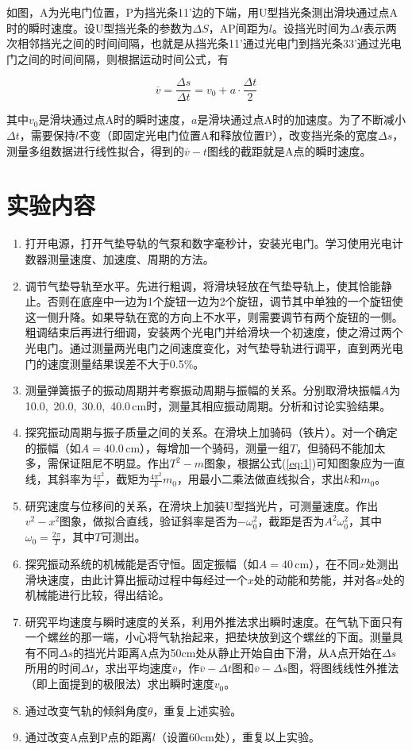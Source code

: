 \documentclass[12pt]{article}
\begin{document}
如图，A为光电门位置，P为挡光条11'边的下端，用U型挡光条测出滑块通过点A时的瞬时速度。设U型挡光条的参数为$\Delta S$，AP间距为$l$。设挡光时间为$\Delta t$表示两次相邻挡光之间的时间间隔，也就是从挡光条11'通过光电门到挡光条33'通过光电门之间的时间间隔，则根据运动时间公式，有

\[
    \overline{v}=\frac{\Delta s}{\Delta t}=v_0+a\cdot\frac{\Delta t}{2}
\]

其中$v_0$是滑块通过点A时的瞬时速度，$a$是滑块通过点A时的加速度。为了不断减小$\Delta t$，需要保持$l$不变（即固定光电门位置A和释放位置P），改变挡光条的宽度$\Delta s$，测量多组数据进行线性拟合，得到的$\overline{v}-t$图线的截距就是A点的瞬时速度。

\section{实验内容}
\begin{enumerate}
    \item 打开电源，打开气垫导轨的气泵和数字毫秒计，安装光电门。学习使用光电计数器测量速度、加速度、周期的方法。
    \item 调节气垫导轨至水平。先进行粗调，将滑块轻放在气垫导轨上，使其恰能静止。否则在底座中一边为1个旋钮一边为2个旋钮，调节其中单独的一个旋钮使这一侧升降。如果导轨在宽的方向上不水平，则需要调节有两个旋钮的一侧。粗调结束后再进行细调，安装两个光电门并给滑块一个初速度，使之滑过两个光电门。通过测量两光电门之间速度变化，对气垫导轨进行调平，直到两光电门的速度测量结果误差不大于0.5\%。
    \item 测量弹簧振子的振动周期并考察振动周期与振幅的关系。分别取滑块振幅$ A $为10.0,\ 20.0,\ 30.0,\ 40.0\,cm时，测量其相应振动周期。分析和讨论实验结果。
    \item 探究振动周期与振子质量之间的关系。在滑块上加骑码（铁片）。对一个确定的振幅（如$A=40.0\,\mathrm{cm}$），每增加一个骑码，测量一组$ T $，但骑码不能加太多，需保证阻尼不明显。作出$ T^2-m $图象，根据公式(\ref{eq:1})可知图象应为一直线，其斜率为$ \frac{4\pi^2}{k} $，截矩为$ \frac{4\pi^2}{k}m_0 $，用最小二乘法做直线拟合，求出$k$和$m_0$。
    \item 研究速度与位移间的关系，在滑块上加装U型挡光片，可测量速度。作出$ v^2-x^2 $图象，做拟合直线，验证斜率是否为$ -\omega_0^2 $，截距是否为$ A^2\omega_0^2 $，其中$ \omega_0=\frac{2\pi}{T} $，其中$ T $可测出。
    \item 探究振动系统的机械能是否守恒。固定振幅（如$A=40\,\mathrm{cm}$），在不同$ x $处测出滑块速度，由此计算出振动过程中每经过一个$ x $处的动能和势能，并对各$ x $处的机械能进行比较，得出结论。
    \item 研究平均速度与瞬时速度的关系，利用外推法求出瞬时速度。在气轨下面只有一个螺丝的那一端，小心将气轨抬起来，把垫块放到这个螺丝的下面。测量具有不同$\Delta s$的挡光片距离A点为50cm处从静止开始自由下滑，从A点开始在$\Delta s$所用的时间$\Delta t$，求出平均速度$\overline{v}$，作$\overline{v}-\Delta t$图和$\overline{v}-\Delta s$图，将图线线性外推法（即上面提到的极限法）求出瞬时速度$v_0$。
    \item 通过改变气轨的倾斜角度$\theta$，重复上述实验。
    \item 通过改变A点到P点的距离$l$（设置60cm处），重复以上实验。
\end{enumerate}
\end{document}
